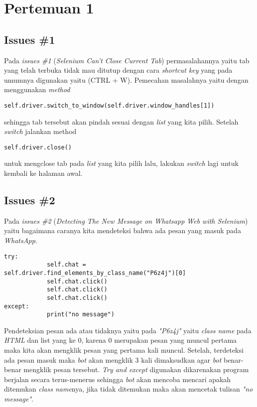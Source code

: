 \chapter{Pertemuan 1}

\section{Issues \#1}
Pada \textit{issues \#1} (\textit{Selenium Can't Close Current Tab}) permasalahannya yaitu tab yang telah terbuka tidak mau ditutup dengan cara \textit{shortcut key} yang pada umumnya digunakan yaitu (CTRL + W). Pemecahan masalahnya yaitu dengan menggunakan \textit{method} \begin{verbatim}
self.driver.switch_to_window(self.driver.window_handles[1])
\end{verbatim}
sehingga tab tersebut akan pindah sesuai dengan \textit{list} yang kita pilih. Setelah \textit{switch} jalankan method \begin{verbatim}
self.driver.close()
\end{verbatim}
untuk mengclose tab pada \textit{list} yang kita pilih lalu, lakukan \textit{switch} lagi untuk kembali ke halaman awal.

\section{Issues \#2}
Pada \textit{issues \#2} (\textit{Detecting The New Message on Whatsapp Web with Selenium}) yaitu bagaimana caranya kita mendeteksi bahwa ada pesan yang masuk pada \textit{WhatsApp}. 
\begin{verbatim}
try:
            self.chat = self.driver.find_elements_by_class_name("P6z4j")[0]
            self.chat.click()
            self.chat.click()
            self.chat.click()
except:
            print("no message")
\end{verbatim}
Pendeteksian pesan ada atau tidaknya yaitu pada \textit{"P6z4j"} yaitu \textit{class name} pada \textit{HTML} dan list yang ke 0, karena 0 merupakan pesan yang muncul pertama maka kita akan mengklik pesan yang pertama kali muncul. Setelah, terdeteksi ada pesan masuk maka \textit{bot} akan mengklik 3 kali dimaksudkan agar \textit{bot} benar-benar mengklik pesan tersebut. \textit{Try and except} digunakan dikarenakan program berjalan secara terus-menerus sehingga \textit{bot} akan mencoba mencari apakah ditemukan \textit{class name}nya, jika tidak ditemukan maka akan mencetak tulisan \textit{"no message"}.

